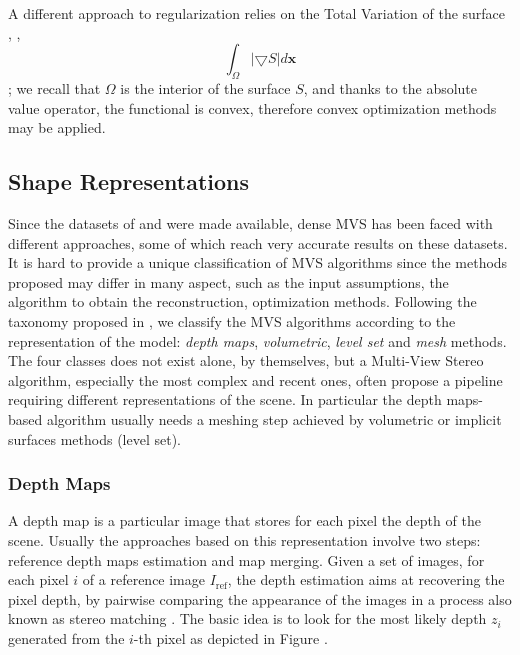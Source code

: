 
A different approach to regularization relies on the Total Variation of the surface \cite{chambolle2010introduction}, \ie, 
\[
\int_{\mathit{\Omega}}|\bigtriangledown \mathit{S}|d\mathbf{x}
\];
we recall that  $\mathit{\Omega}$ is the interior of the surface $\mathit{S}$, and thanks to the absolute value operator, the functional is convex, therefore convex optimization methods may be applied.



\subsection{Shape Representations}
Since the datasets of \cite{Seitz_et_al06} and \cite{strecha2008} were made available, dense MVS has been faced with different approaches, some of which reach very accurate results on these datasets.
It is hard to provide a unique classification of MVS algorithms since the methods proposed may differ in many aspect, such as the input assumptions, the algorithm to obtain the reconstruction, optimization methods. Following the taxonomy proposed in \cite{Seitz_et_al06}, we classify the MVS algorithms according to the representation of the model: \emph{depth maps}, \emph{volumetric},  \emph{level set} and \emph{mesh} methods. The four classes does not exist alone, by themselves, but a Multi-View Stereo algorithm, especially the most complex and recent ones, often propose a pipeline requiring different representations of the scene. In particular the depth maps-based algorithm usually needs a meshing step achieved by volumetric or implicit surfaces methods (level set).

\subsubsection{Depth Maps}
A depth map is a particular image that stores for each pixel the depth of the scene.
Usually the approaches based on this representation involve two steps: reference depth maps estimation and map merging.
Given a set of images, for each pixel $i$ of a reference image $I_{\text{ref}}$, the depth estimation aims at recovering the pixel depth, by pairwise comparing the appearance of the images in a process also known as stereo matching \cite{scharstein2002taxonomy}. 
The basic idea is to look for the most likely depth $z_i$ generated from the $i$-th pixel as depicted in Figure .

